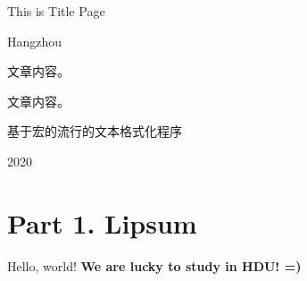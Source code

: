\documentclass[a4paper]{article}
\begin{document}
\begin{center}

{\Huge 
This is Title Page
}
\vspace{10cm} %

\LARGE Hangzhou

\begin{CJK*}{UTF8}{gbsn} %
文章内容。

文章内容。

基于宏的流行的文本格式化程序
\end{CJK*}

2020
\rm %
\end{center}

\newpage %
\setcounter{page}{2} %

\section{Part 1. Lipsum}

Hello, world! \textbf{We are lucky to study in HDU! =)}

\lipsum[7] %

\medskip %

\lipsum[10] %

\bigskip %

\lipsum[7-10] %

\end{document}
